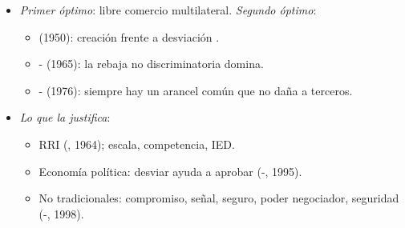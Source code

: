 \documentclass{article}
\begin{document}
\begin{columnas}
\begin{itemize}
\item \emph{Primer óptimo}: libre comercio multilateral. \emph{Segundo óptimo}:
  \begin{itemize}
  \item {} (1950): creación frente a desviación .
  \item {}- (1965): la rebaja no discriminatoria domina.
  \item {}- (1976): siempre hay un arancel común que no daña a terceros.
  \end{itemize}
\item \emph{Lo que la justifica}:
  \begin{itemize}
  \item RRI (, 1964); escala, competencia, IED.
  \item Economía política: desviar ayuda a aprobar (-, 1995).
  \item No tradicionales: compromiso, señal, seguro, poder negociador, seguridad (-, 1998).
  \end{itemize}
\end{itemize}


\end{columnas}
\end{document}
